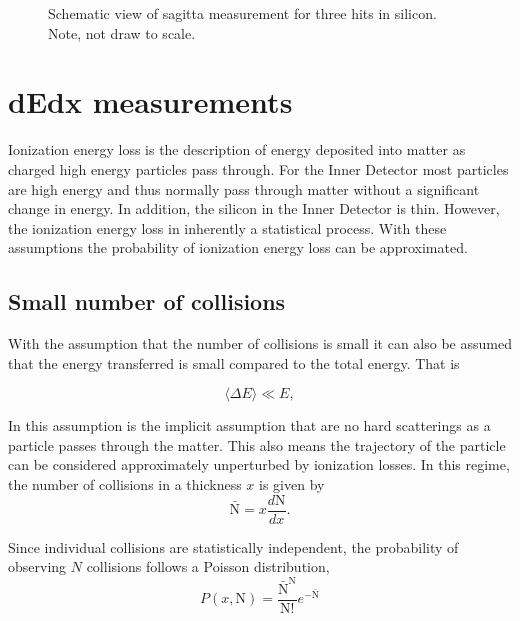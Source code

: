 \begin{figure}
	\caption{Schematic view of sagitta measurement for three hits in silicon. Note, not draw to scale.}
	\label{fig:sagitta}
\end{figure}
	
\section{dEdx measurements}

Ionization energy loss is the description of energy deposited into matter as charged high energy particles pass through. For the Inner Detector most particles are high energy and thus normally pass through matter without a significant change in energy. In addition, the silicon in the Inner Detector is thin. However, the ionization energy loss in inherently a statistical process. With these assumptions the probability of ionization energy loss can be approximated. 


\subsection{Small number of collisions}

With the assumption that the number of collisions is small it can also be assumed that the energy transferred is small compared to the total energy. That is 

\[
\langle \Delta E \rangle \ll E,
\]

In this assumption is the implicit assumption that are no hard scatterings as a particle passes through the matter. 
This also means the trajectory of the particle can be considered approximately unperturbed by ionization losses. In this regime, the number of collisions in a thickness $x$ is given by
\[
\bar{\text{N}} = x \frac{d\text{N}}{dx}.
\]

Since individual collisions are statistically independent, the probability of observing $N$ collisions follows a Poisson distribution,
\begin{equation}
	P(x, \text{N}) = \frac{\bar{\text{N}}^{\text{N}}}{\text{N}!} e^{-\bar{\text{N}}}
\end{equation}

